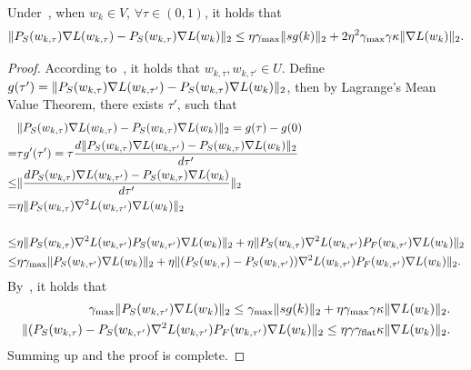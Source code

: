     
    \begin{lemma}
    \label{lem:moveg}
        Under~, when $w_k \in V$, $\forall \tau \in (0, 1)$, it holds that 
        \begin{align*}
            \|  {P}_S(w_{k, \tau}) \nabla L(w_{k, \tau}) - {P}_S(w_{k, \tau}) \nabla L(w_k) \|_2 \le \eta \gamma_{\mathrm{max}} \|  sg(k) \|_2 + 2\eta^2 \gamma_{\mathrm{max}} \gamma \kappa \| \nabla L(w_k)\|_2.
        \end{align*}
    \end{lemma}

    \begin{proof}
        According to~, it holds that $w_{k, \tau}, w_{k, \tau'} \in U$.
        Define $g(\tau') = \| {P}_S(w_{k, \tau}) \nabla L(w_{k, \tau'}) - {P}_S(w_{k, \tau}) \nabla L(w_k) \|_2  $, then by  Lagrange's Mean Value Theorem, there exists $\tau'$, such that
        \begin{align*}
            &\|  {P}_S(w_{k, \tau}) \nabla L(w_{k, \tau}) - {P}_S(w_{k, \tau}) \nabla L(w_k) \|_2 = g(\tau) - g(0) \\
            =& \tau g'(\tau') = \tau \frac{ d \|  {P}_S(w_{k, \tau}) \nabla L(w_{k, \tau'}) - {P}_S(w_{k, \tau}) \nabla L(w_k) \|_2}{d\tau'} \\
            \le& \| \frac{ d   {P}_S(w_{k, \tau}) \nabla L(w_{k, \tau'}) - {P}_S(w_{k, \tau}) \nabla L(w_k) }{d\tau'} \|_2 \\
            =& \eta \| {P}_S(w_{k, \tau}) \nabla^2 L(w_{k, \tau'}) \nabla L(w_k) \|_2 \\
             \\
            \le & \eta  \| {P}_S(w_{k, \tau}) \nabla^2 L(w_{k, \tau'}) {P}_S (w_{k, \tau'}) \nabla L(w_k) \|_2  + \eta \| {P}_S(w_{k, \tau}) \nabla^2 L(w_{k, \tau'}) {P}_F (w_{k, \tau'}) \nabla L(w_k) \|_2 \\
            \le & \eta \gamma_{\mathrm{max}} \|  {P}_S (w_{k, \tau'}) \nabla L(w_k) \|_2 + \eta \| ({P}_S(w_{k, \tau}) - {P}_S(w_{k, \tau'})) \nabla^2 L(w_{k, \tau'}) {P}_F (w_{k, \tau'}) \nabla L(w_k) \|_2.
        \end{align*}
        By~, it holds that
        \begin{align*}
            \gamma_{\mathrm{max}} \|  {P}_S (w_{k, \tau'}) \nabla L(w_k) \|_2 \le \gamma_{\mathrm{max}} \|  sg(k) \|_2 + \eta \gamma_{\mathrm{max}} \gamma \kappa \| \nabla L(w_k)\|_2. \\
            \| ({P}_S(w_{k, \tau}) - {P}_S(w_{k, \tau'}) \nabla^2 L(w_{k, \tau'}) {P}_F (w_{k, \tau'}) \nabla L(w_k) \|_2 \le
            \eta \gamma  \gamma_{\mathrm{flat}} \kappa \| \nabla L(w_k)\|_2.
        \end{align*}
        Summing up and the proof is complete.
    \end{proof}

